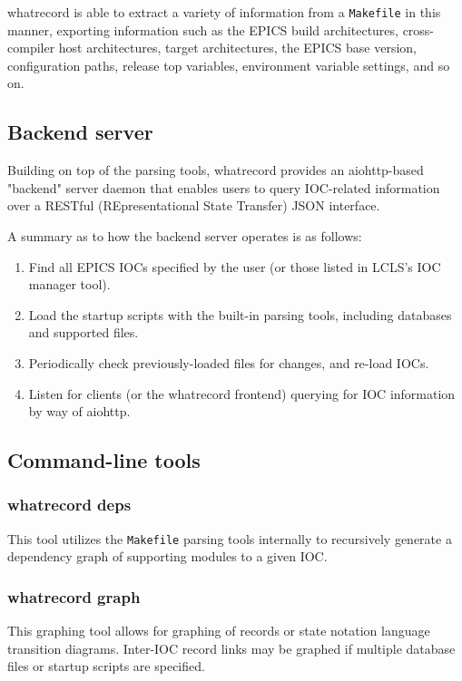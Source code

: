 \documentclass[letter,
               keeplastbox,   %
               ]{jacow}
\begin{document}
whatrecord is able to extract a variety of information from a \verb_Makefile_
in this manner, exporting information such as the EPICS build architectures,
cross-compiler host architectures, target architectures, the EPICS base
version, configuration paths, release top variables, environment variable
settings, and so on.

\subsection{Backend server}

Building on top of the parsing tools, whatrecord provides an
aiohttp\cite{aiohttp}-based "backend" server daemon that enables users to query
IOC-related information over a RESTful (REpresentational State Transfer) JSON
interface.

A summary as to how the backend server operates is as follows:

\begin{enumerate}
  \item Find all EPICS IOCs specified by the user (or those listed in LCLS's
    IOC manager tool).
  \item Load the startup scripts with the built-in parsing tools, including
    databases and supported files.
  \item Periodically check previously-loaded files for changes, and re-load
    IOCs.
  \item Listen for clients (or the whatrecord frontend) querying for IOC
    information by way of aiohttp.
\end{enumerate}

\subsection{Command-line tools}
\subsubsection{whatrecord deps}

This tool utilizes the \verb_Makefile_ parsing tools internally to recursively
generate a dependency graph of supporting modules to a given IOC.

\subsubsection{whatrecord graph}

This graphing tool allows for graphing of records or state notation language
transition diagrams. Inter-IOC record links may be graphed if multiple
database files or startup scripts are specified.
\end{document}
